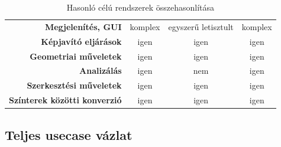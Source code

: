 \documentclass[a4paper,12pt,oneside]{report}
\begin{document}
\begin{landscape}
\begin{table}[h]
\begin{tabular}{@{}rccc@{}}
\textbf{Megjelenítés, GUI} & komplex & egyszerű letisztult & komplex \\
\textbf{Képjavító eljárások} & igen & igen & igen \\
\textbf{Geometriai műveletek} & igen & igen & igen \\
\textbf{Analizálás} & igen & nem & igen \\
\textbf{Szerkesztési műveletek} & igen & igen & igen \\
\textbf{Színterek közötti konverzió} & igen & igen & igen \\ \bottomrule
\end{tabular}
\caption{Hasonló célú rendszerek összehasonlítása}
\label{table:diff_soft}

\end{table} 
\end{landscape}




\subsection{Teljes usecase vázlat}
\label{fig:bimg_usecase_schema_full}

\end{document}
